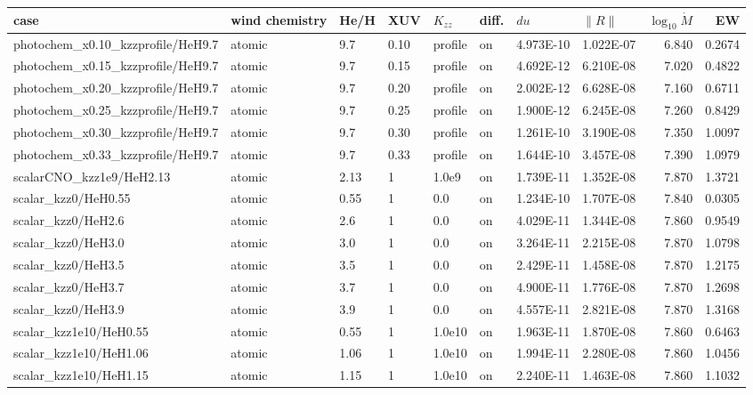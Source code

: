 \documentclass[11pt]{my_memo}
\begin{document}
\scriptsize\linespread{1.0}\selectfont\begin{longtable}{@{}l >{\raggedright\arraybackslash}p{1.5cm} l l l l l l r r@{}}
\toprule
case & wind chemistry & He/H & XUV & $K_{zz}$ & diff. & $du$ & $\lVert R\rVert$ & $\log_{10}\dot{M}$ & EW\\
\midrule
\endhead
photochem\_x0.10\_kzzprofile/HeH9.7 & atomic & 9.7 & 0.10 & profile & on & 4.973E-10 & 1.022E-07 & 6.840 & 0.2674\\
photochem\_x0.15\_kzzprofile/HeH9.7 & atomic & 9.7 & 0.15 & profile & on & 4.692E-12 & 6.210E-08 & 7.020 & 0.4822\\
photochem\_x0.20\_kzzprofile/HeH9.7 & atomic & 9.7 & 0.20 & profile & on & 2.002E-12 & 6.628E-08 & 7.160 & 0.6711\\
photochem\_x0.25\_kzzprofile/HeH9.7 & atomic & 9.7 & 0.25 & profile & on & 1.900E-12 & 6.245E-08 & 7.260 & 0.8429\\
photochem\_x0.30\_kzzprofile/HeH9.7 & atomic & 9.7 & 0.30 & profile & on & 1.261E-10 & 3.190E-08 & 7.350 & 1.0097\\
photochem\_x0.33\_kzzprofile/HeH9.7 & atomic & 9.7 & 0.33 & profile & on & 1.644E-10 & 3.457E-08 & 7.390 & 1.0979\\
scalarCNO\_kzz1e9/HeH2.13 & atomic & 2.13 & 1 & 1.0e9 & on & 1.739E-11 & 1.352E-08 & 7.870 & 1.3721\\
scalar\_kzz0/HeH0.55 & atomic & 0.55 & 1 & 0.0 & on & 1.234E-10 & 1.707E-08 & 7.840 & 0.0305\\
scalar\_kzz0/HeH2.6 & atomic & 2.6 & 1 & 0.0 & on & 4.029E-11 & 1.344E-08 & 7.860 & 0.9549\\
scalar\_kzz0/HeH3.0 & atomic & 3.0 & 1 & 0.0 & on & 3.264E-11 & 2.215E-08 & 7.870 & 1.0798\\
scalar\_kzz0/HeH3.5 & atomic & 3.5 & 1 & 0.0 & on & 2.429E-11 & 1.458E-08 & 7.870 & 1.2175\\
scalar\_kzz0/HeH3.7 & atomic & 3.7 & 1 & 0.0 & on & 4.900E-11 & 1.776E-08 & 7.870 & 1.2698\\
scalar\_kzz0/HeH3.9 & atomic & 3.9 & 1 & 0.0 & on & 4.557E-11 & 2.821E-08 & 7.870 & 1.3168\\
scalar\_kzz1e10/HeH0.55 & atomic & 0.55 & 1 & 1.0e10 & on & 1.963E-11 & 1.870E-08 & 7.860 & 0.6463\\
scalar\_kzz1e10/HeH1.06 & atomic & 1.06 & 1 & 1.0e10 & on & 1.994E-11 & 2.280E-08 & 7.860 & 1.0456\\
scalar\_kzz1e10/HeH1.15 & atomic & 1.15 & 1 & 1.0e10 & on & 2.240E-11 & 1.463E-08 & 7.860 & 1.1032\\

\end{longtable}
\end{document}
